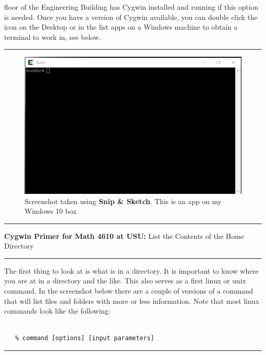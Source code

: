 \documentclass[10pt,fleqn]{article}
\begin{document}
floor of the Engineering  Building has Cygwin installed and running if this
option is needed. Once you have a version of Cygwin available, you can double
click the icon on the Desktop or in the list apps on a Windows machine to
obtain a terminal to work in, see below.
\vskip0.1in\hrule\vskip0.1in
\vfill
\begin{figure}[h]
\centering
\includegraphics{./images/cygwin_01.png}
\caption{{Screenshot} taken using {\bf Snip \& Sketch}. This is an app on
         my Windows 10 box}
\end{figure}
\eject
\vskip0.1in\hrule\vskip0.1in
\noindent
{{\bf Cygwin Primer for Math 4610 at USU:} List the Contents of the Home
    Directory} 
\vskip0.1in\hrule\vskip0.1in
\noindent
The first thing to look at is what is in a directory. It is important to know
where you are at in a directory and the like. This also serves as a first linux
or unix command. In the screenshot below there are a couple of versions of a
command that will list files and folders with more or less information. Note
that most linux commands look like the following:
\begin{verbatim}

   % command [options] [input parameters]

\end{verbatim}
\vskip0.1in\hrule\vskip0.1in
\vfill
\end{document}
